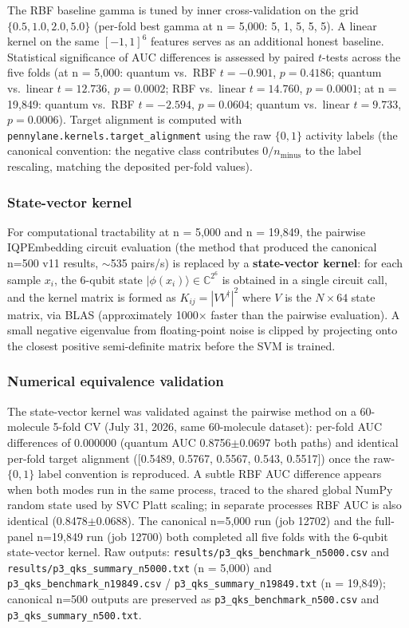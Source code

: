 \documentclass[11pt,a4paper]{article}
\begin{document}
The RBF baseline gamma is tuned by inner cross-validation on the grid $\{0.5, 1.0, 2.0, 5.0\}$ (per-fold best gamma at n = 5,000: 5, 1, 5, 5, 5). A linear kernel on the same $[-1,1]^6$ features serves as an additional honest baseline. Statistical significance of AUC differences is assessed by paired $t$-tests across the five folds (at n = 5,000: quantum vs.\ RBF $t=-0.901$, $p=0.4186$; quantum vs.\ linear $t=12.736$, $p=0.0002$; RBF vs.\ linear $t=14.760$, $p=0.0001$; at n = 19,849: quantum vs.\ RBF $t=-2.594$, $p=0.0604$; quantum vs.\ linear $t=9.733$, $p=0.0006$). Target alignment is computed with \texttt{pennylane.kernels.target\_alignment} using the raw $\{0,1\}$ activity labels (the canonical convention: the negative class contributes $0/n_{\text{minus}}$ to the label rescaling, matching the deposited per-fold values).

\subsubsection{State-vector kernel}
For computational tractability at n = 5,000 and n = 19,849, the pairwise IQPEmbedding circuit evaluation (the method that produced the canonical n=500 v11 results, $\sim$535 pairs/s) is replaced by a \textbf{state-vector kernel}: for each sample $x_i$, the 6-qubit state $|\phi(x_i)\rangle \in \mathbb{C}^{2^6}$ is obtained in a single circuit call, and the kernel matrix is formed as $K_{ij} = |V V^\dagger|^2$ where $V$ is the $N \times 64$ state matrix, via BLAS (approximately \num{1000}$\times$ faster than the pairwise evaluation). A small negative eigenvalue from floating-point noise is clipped by projecting onto the closest positive semi-definite matrix before the SVM is trained.

\subsubsection{Numerical equivalence validation}
The state-vector kernel was validated against the pairwise method on a 60-molecule 5-fold CV (July 31, 2026, same 60-molecule dataset): per-fold AUC differences of 0.000000 (quantum AUC 0.8756$\pm$0.0697 both paths) and identical per-fold target alignment ([0.5489, 0.5767, 0.5567, 0.543, 0.5517]) once the raw-$\{0,1\}$ label convention is reproduced. A subtle RBF AUC difference appears when both modes run in the same process, traced to the shared global NumPy random state used by SVC Platt scaling; in separate processes RBF AUC is also identical (0.8478$\pm$0.0688). The canonical n=5,000 run (job 12702) and the full-panel n=19,849 run (job 12700) both completed all five folds with the 6-qubit state-vector kernel. Raw outputs: \texttt{results/p3\_qks\_benchmark\_n5000.csv} and \texttt{results/p3\_qks\_summary\_n5000.txt} (n = 5,000) and \texttt{p3\_qks\_benchmark\_n19849.csv} / \texttt{p3\_qks\_summary\_n19849.txt} (n = 19,849); canonical n=500 outputs are preserved as \texttt{p3\_qks\_benchmark\_n500.csv} and \texttt{p3\_qks\_summary\_n500.txt}.
\end{document}
